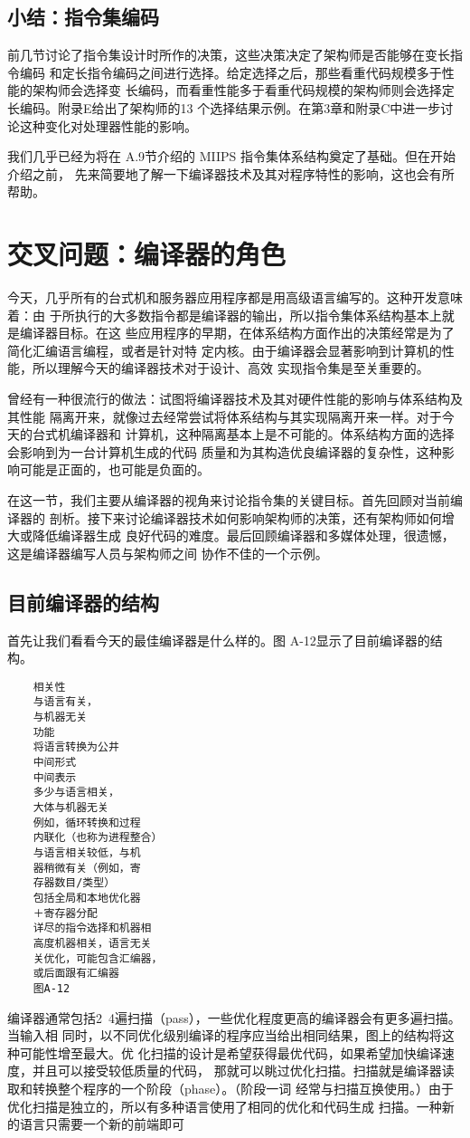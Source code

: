 \subsection{小结：指令集编码}
前几节讨论了指令集设计时所作的决策，这些决策决定了架构师是否能够在变长指令编码
和定长指令编码之间进行选择。给定选择之后，那些看重代码规模多于性能的架构师会选择变
长编码，而看重性能多于看重代码规模的架构师则会选择定长编码。附录E给出了架构师的13
个选择结果示例。在第3章和附录C中进一步讨论这种变化对处理器性能的影响。

我们几乎已经为将在 A.9节介绍的 MIIPS 指令集体系结构奠定了基础。但在开始介绍之前，
先来简要地了解一下编译器技术及其对程序特性的影响，这也会有所帮助。

\section{交叉问题：编译器的角色}

今天，几乎所有的台式机和服务器应用程序都是用高级语言编写的。这种开发意味着：由
于所执行的大多数指令都是编译器的输出，所以指令集体系结构基本上就是编译器目标。在这
些应用程序的早期，在体系结构方面作出的决策经常是为了简化汇编语言编程，或者是针对特
定内核。由于编译器会显著影响到计算机的性能，所以理解今天的编译器技术对于设计、高效
实现指令集是至关重要的。

曾经有一种很流行的做法：试图将编译器技术及其对硬件性能的影响与体系结构及其性能
隔离开来，就像过去经常尝试将体系结构与其实现隔离开来一样。对于今天的台式机编译器和
计算机，这种隔离基本上是不可能的。体系结构方面的选择会影响到为一台计算机生成的代码
质量和为其构造优良编译器的复杂性，这种影响可能是正面的，也可能是负面的。

在这一节，我们主要从编译器的视角来讨论指令集的关键目标。首先回顾对当前编译器的
剖析。接下来讨论编译器技术如何影响架构师的决策，还有架构师如何增大或降低编译器生成
良好代码的难度。最后回顾编译器和多媒体处理，很遗憾，这是编译器编写人员与架构师之间
协作不佳的一个示例。

\subsection{目前编译器的结构}

首先让我们看看今天的最佳编译器是什么样的。图 A-12显示了目前编译器的结构。
\begin{verbatim}
    相关性
    与语言有关，
    与机器无关
    功能
    将语言转换为公井
    中间形式
    中间表示
    多少与语言相关，
    大体与机器无关
    例如，循环转换和过程
    内联化（也称为进程整合）
    与语言相关较低，与机
    器稍微有关（例如，寄
    存器数目/类型）
    包括全局和本地优化器
    ＋寄存器分配
    详尽的指令选择和机器相
    高度机器相关，语言无关
    关优化，可能包含汇编器，
    或后面跟有汇编器
    图A-12
\end{verbatim}
编译器通常包括2~4遍扫描（pass），一些优化程度更高的编译器会有更多遍扫描。当输入相
同时，以不同优化级别编译的程序应当给出相同结果，图上的结构将这种可能性增至最大。优
化扫描的设计是希望获得最优代码，如果希望加快编译速度，并且可以接受较低质量的代码，
那就可以眺过优化扫描。扫描就是编译器读取和转换整个程序的一个阶段（phase）。（阶段一词
经常与扫描互换使用。）由于优化扫描是独立的，所以有多种语言使用了相同的优化和代码生成
扫描。一种新的语言只需要一个新的前端即可

